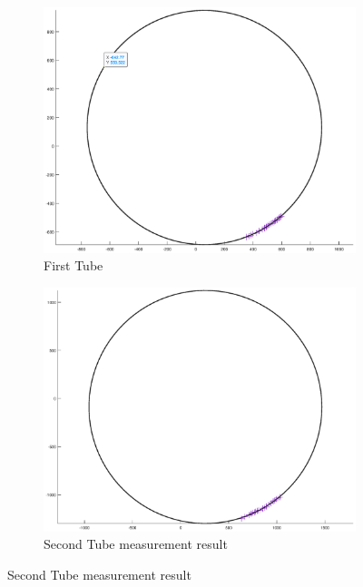 \documentclass[12pt, twoside]{report}
\begin{document}
\begin{figure}[H]
     \centering
     \begin{subfigure}[b]{0.5\textwidth}
         \centering
         \includegraphics[width=\textwidth]{TP_1/curve1.eps}
         \caption{First Tube}
         \label{figtube1}
     \end{subfigure}
     \hfill
     \begin{subfigure}[b]{0.5\textwidth}
         \centering
         \includegraphics[width=\textwidth]{TP_1/curve2.eps}
         \caption{Second Tube measurement result}
         \label{fig:tube2}
     \end{subfigure}

\end{figure}
\end{document}
